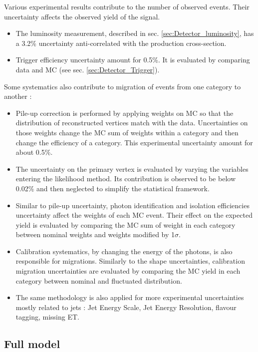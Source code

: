 \begin{enumerate}
Various experimental results contribute to the number of observed events.
Their uncertainty affects the observed yield of the signal.
\begin{itemize}
\item The luminosity measurement, described in sec. \ref{sec:Detector_luminosity}, has a 3.2\% uncertainty anti-correlated with the production cross-section.
\item Trigger efficiency uncertainty amount for 0.5\%.
It is evaluated by comparing data and MC (see sec. \ref{sec:Detector_Trigger}).
\end{itemize}

Some systematics also contribute to migration of events from one category to another :
\begin{itemize}
\item Pile-up correction is performed by applying weights on MC so that the distribution of reconstructed vertices match with the data.
Uncertainties on those weights change the MC sum of weights within a category and then change the efficiency of a category.
This experimental uncertainty amount for about 0.5\%.
\item The uncertainty on the primary vertex is evaluated by varying the variables entering the likelihood method.
Its contribution is observed to be below 0.02\% and then neglected to simplify the statistical framework.
\item Similar to pile-up uncertainty, photon identification and isolation efficiencies uncertainty affect the weights of each MC event.
Their effect on the expected yield is evaluated by comparing the MC sum of weight in each category between nominal weights and weights modified by 1$\sigma$.

\item Calibration systematics, by changing the energy of the photons, is also responsible for migrations.
Similarly to the shape uncertainties, calibration migration uncertainties are evaluated by comparing the MC yield in each category between nominal and fluctuated distribution.

\item The same methodology is also applied for more experimental uncertainties mostly related to jets : Jet Energy Scale, Jet Energy Resolution, flavour tagging, missing ET.
\end{itemize}
\end{enumerate}


\subsection{Full model}

